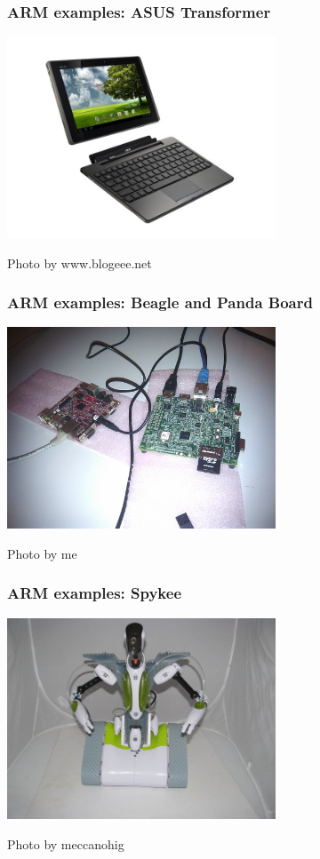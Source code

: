 \documentclass{beamer}
\begin{document}
\begin{frame}[t]
\frametitle{ARM examples: ASUS Transformer}
\begin{center}
\includegraphics[height=6cm]{Transformer.jpg}

{\scriptsize Photo by www.blogeee.net}
\end{center}
\end{frame}

\begin{frame}[t]
\frametitle{ARM examples: Beagle and Panda Board}
\begin{center}
\includegraphics[height=6cm]{beaglepanda.jpg}

{\scriptsize Photo by me}
\end{center}
\end{frame}

\begin{frame}[t]
\frametitle{ARM examples: Spykee}
\begin{center}
\includegraphics[height=6cm]{spykee.jpg}

{\scriptsize Photo by meccanohig}
\end{center}
\end{frame}
\end{document}
